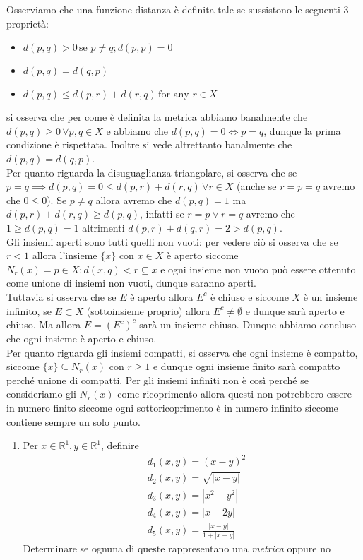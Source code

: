 \documentclass{report}
\begin{document}
\begin{mysolution}
Osserviamo che una funzione distanza è definita tale se sussistono le seguenti 3 proprietà:
\begin{itemize}
	\item $d(p, q) > 0 \, \text{se } p \neq q; d(p, p) = 0$
	\item $d(p, q) = d(q, p)$
	\item $d(p, q) \leq d(p, r) + d(r, q) \, \text{for any } r \in X$
\end{itemize}
si osserva che per come è definita la metrica abbiamo banalmente che $d(p, q) \geq 0 \, \forall p, q \in X$ e abbiamo che $d(p, q) = 0 \iff p=q$, dunque la prima condizione è rispettata. Inoltre si vede altrettanto banalmente che $d(p, q) = d(q,p)$. \\
Per quanto riguarda la disuguaglianza triangolare, si osserva che se $p = q \implies d(p, q) = 0 \leq d(p, r) + d(r, q) \, \forall r \in X$ (anche se $r = p = q$ avremo che $0 \leq 0$). Se $p \neq q$ allora avremo che $d(p, q) = 1$ ma $d(p, r) + d(r, q) \geq d(p, q)$, infatti se $r = p \vee r = q$ avremo che $1 \geq d(p, q) = 1$ altrimenti $d(p, r) + d(q, r) = 2 > d(p, q)$. \\
Gli insiemi aperti sono tutti quelli non vuoti: per vedere ciò si osserva che se $r < 1$ allora l'insieme $\{x\}$ con $x \in X$ è aperto siccome $N_r(x) = {p \in X: d(x, q) < r} \subseteq {x}$ e ogni insieme non vuoto può essere ottenuto come unione di insiemi non vuoti, dunque saranno aperti. \\
Tuttavia si osserva che se $E$ è aperto allora $E^c$ è chiuso e siccome $X$ è un insieme infinito, se $E \subset X$ (sottoinsieme proprio) allora $E^c \neq \emptyset$ e dunque sarà aperto e chiuso. Ma allora $E = (E^c)^c$ sarà un insieme chiuso. Dunque abbiamo concluso che ogni insieme è aperto e chiuso. \\
Per quanto riguarda gli insiemi compatti, si osserva che ogni insieme è compatto, siccome $\{ x \} \subseteq N_r(x)$ con $r \geq 1$ e dunque ogni insieme finito sarà compatto perché unione di compatti. Per gli insiemi infiniti non è così perché se consideriamo gli $N_r(x)$ come ricoprimento allora questi non potrebbero essere in numero finito siccome ogni sottoricoprimento è in numero infinito siccome contiene sempre un solo punto.
\end{mysolution}
\begin{enumerate}[resume, label=\protect\circled{\arabic*}]
	\item Per $x \in \mathbb{R}^1, y \in \mathbb{R}^1$, definire
	\begin{align*}
		&d_1(x, y) = (x-y)^2 \\
		&d_2(x, y) = \sqrt{|x-y|} \\
		&d_3(x, y) = |x^2 - y^2| \\
		&d_4(x, y) = |x - 2y| \\
		&d_5(x, y) = \frac{|x-y|}{1+|x-y|}
	\end{align*}
	Determinare se ognuna di queste rappresentano una \emph{metrica} oppure no
\end{enumerate}
\end{document}

